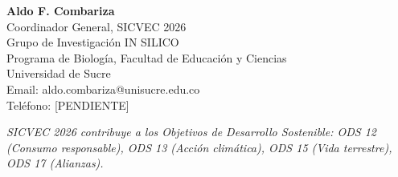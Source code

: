 \documentclass[12pt,a4paper]{article}
\begin{document}
\vspace{2cm}

\textbf{Aldo F. Combariza}\\
Coordinador General, SICVEC 2026\\
Grupo de Investigación IN SILICO\\
Programa de Biología, Facultad de Educación y Ciencias\\
Universidad de Sucre\\
Email: aldo.combariza@unisucre.edu.co\\
Teléfono: [PENDIENTE]

\vspace{1cm}

\noindent
\textit{SICVEC 2026 contribuye a los Objetivos de Desarrollo Sostenible: ODS 12 (Consumo responsable), ODS 13 (Acción climática), ODS 15 (Vida terrestre), ODS 17 (Alianzas).}
\end{document}
